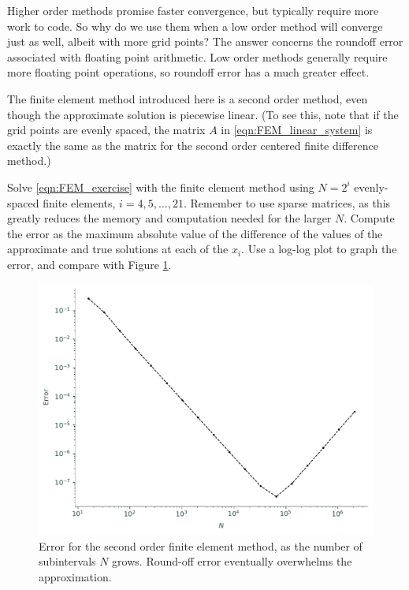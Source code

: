 \begin{problem}
\label{prob:FEM_accuracy_comparison}
Higher order methods promise faster convergence, but typically require more work to code.
So why do we use them when a low order method will converge just as well, albeit with more grid points?
The answer concerns the roundoff error associated with floating point arithmetic.
Low order methods generally require more floating point operations, so roundoff error has a much greater effect.

The finite element method introduced here is a second order method, even though the approximate solution is piecewise linear.
(To see this, note that if the grid points are evenly spaced, the matrix $A$ in \eqref{eqn:FEM_linear_system} is exactly the same as the matrix for the second order centered finite difference method.)

Solve \eqref{eqn:FEM_exercise} with the finite element method using $N = 2^i$ evenly-spaced finite elements, $i = 4, 5, \ldots, 21$.
Remember to use sparse matrices, as this greatly reduces the memory and computation needed for the larger \(N\).
Compute the error as the maximum absolute value of the difference of the values of the approximate and true solutions at each of the \(x_i\).
Use a log-log plot to graph the error, and compare with Figure \ref{fig:FEM_error_2nd_order}.
\end{problem}


\begin{figure}[ht]
\centering
\includegraphics[width=\textwidth]{figures/FEM_error_2nd_order.pdf}
\caption{Error for the second order finite element method, as the number of subintervals $N$ grows. Round-off error eventually overwhelms the approximation. }
\label{fig:FEM_error_2nd_order}
\end{figure}

